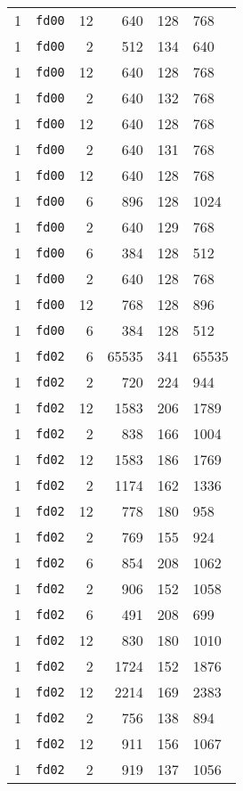 \documentclass{article}
\begin{document}
\begin{table}[h!]
\begin{tabular}{llrrrl}
    1 & \texttt{fd00} & 12 & 640 & 128 & 768 \\
    1 & \texttt{fd00} & 2 & 512 & 134 & 640 \\
    1 & \texttt{fd00} & 12 & 640 & 128 & 768 \\
    1 & \texttt{fd00} & 2 & 640 & 132 & 768 \\
    1 & \texttt{fd00} & 12 & 640 & 128 & 768 \\
    1 & \texttt{fd00} & 2 & 640 & 131 & 768 \\
    1 & \texttt{fd00} & 12 & 640 & 128 & 768 \\
    1 & \texttt{fd00} & 6 & 896 & 128 & 1024 \\
    1 & \texttt{fd00} & 2 & 640 & 129 & 768 \\
    1 & \texttt{fd00} & 6 & 384 & 128 & 512 \\
    1 & \texttt{fd00} & 2 & 640 & 128 & 768 \\
    1 & \texttt{fd00} & 12 & 768 & 128 & 896 \\
    1 & \texttt{fd00} & 6 & 384 & 128 & 512 \\
    1 & \texttt{fd02} & 6 & 65535 & 341 & 65535 \\
    1 & \texttt{fd02} & 2 & 720 & 224 & 944 \\
    1 & \texttt{fd02} & 12 & 1583 & 206 & 1789 \\
    1 & \texttt{fd02} & 2 & 838 & 166 & 1004 \\
    1 & \texttt{fd02} & 12 & 1583 & 186 & 1769 \\
    1 & \texttt{fd02} & 2 & 1174 & 162 & 1336 \\
    1 & \texttt{fd02} & 12 & 778 & 180 & 958 \\
    1 & \texttt{fd02} & 2 & 769 & 155 & 924 \\
    1 & \texttt{fd02} & 6 & 854 & 208 & 1062 \\
    1 & \texttt{fd02} & 2 & 906 & 152 & 1058 \\
    1 & \texttt{fd02} & 6 & 491 & 208 & 699 \\
    1 & \texttt{fd02} & 12 & 830 & 180 & 1010 \\
    1 & \texttt{fd02} & 2 & 1724 & 152 & 1876 \\
    1 & \texttt{fd02} & 12 & 2214 & 169 & 2383 \\
    1 & \texttt{fd02} & 2 & 756 & 138 & 894 \\
    1 & \texttt{fd02} & 12 & 911 & 156 & 1067 \\
    1 & \texttt{fd02} & 2 & 919 & 137 & 1056 \\

\end{tabular}
\end{table}
\end{document}
